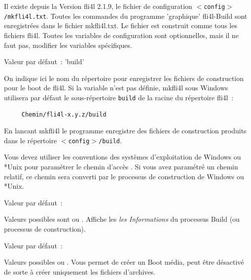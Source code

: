 
  Il existe depuis la Version fli4l 2.1.9, le fichier de
  configuration \texttt{$<$config$>$/mkfli4l.txt}. Toutes les commandes
  du programme 'graphique' fli4l-Build sont enregistrées dans
  le fichier mkfli4l.txt. Le fichier est construit comme tous
  les fichiers fli4l. Toutes les variables de configuration sont
  optionnelles, mais il ne faut pas, modifier les variables spécifiques.

  \begin{description}


  Valeur par défaut~: 'build'

  On indique ici le nom du répertoire pour enregistrer les fichiers de
  construction pour le boot de fli4l. Si la variable n'est pas définie, mkfli4l
  sous Windows utilisera par défaut le sous-répertoire \texttt{build} de la racine
  du répertoire fli4l~:
  \begin{verbatim}
     Chemin/fli4l-x.y.z/build
  \end{verbatim}
  \vspace{-2ex}
  En lancant mkfli4l le programme enregistre des fichiers de
  construction produits dans le répertoire \texttt{$<$config$>$/build}.

  Vous devez utiliser les conventions des systèmes d'exploitation de Windows ou
  *Unix pour paramétrer le chemin d'accès . Si vous avez paramétré
  un chemin relatif, ce chemin sera converti par le processus de construction
  de Windows ou *Unix.


  Valeur par défaut~: 

  Valeurs possibles sont  ou . Affiche les
  \emph{les Informations} du processus Build (ou processus de construction).


  Valeur par défaut~: 

  Valeurs possibles  ou . Vous permet de créer un Boot
  média, peut être désactivé de sorte à créer uniquement les fichiers d'archives.


\end{description}
